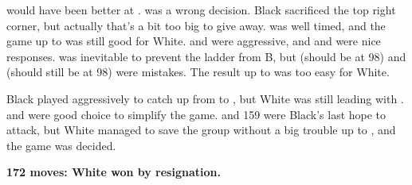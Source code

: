 \documentclass[letterpaper,12pt]{memoir}
\begin{document}
{} would have been better at {}.
{} was a wrong decision. Black sacrificed the top right corner, but actually that's a bit too big to give away.
{} was well timed, and the game up to {} was still good for White.
{} and {} were aggressive, and {} and {} were nice responses.
{} was inevitable to prevent the ladder from B, but {} (should be at 98) and {} (should still be at 98) were mistakes.
The result up to {} was too easy for White.

Black played aggressively to catch up from {} to {}, but White was still leading with {}.
{} and {} were good choice to simplify the game.
{} and 159 were Black's last hope to attack, but White managed to save the group without a big trouble up to {}, and the game was decided.

\textbf{172 moves: White won by resignation.}


\vfill
\end{document}
